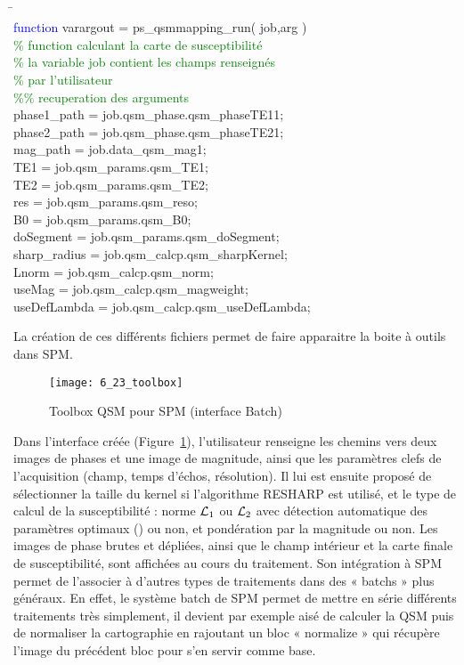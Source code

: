 {{\tt
\begin{tabbing}
\hspace{1cm}\=\hspace{1cm}\\
\> \textcolor{blue}{function} varargout = ps\_qsmmapping\_run( job,arg )\\
\> \textcolor{green}{\% function calculant la carte de susceptibilité}\\
\> \textcolor{green}{\% la variable job contient les champs renseignés}\\
\> \textcolor{green}{\% par l’utilisateur}\\
\> \textcolor{green}{\%\% recuperation des arguments}\\
\> phase1\_path = job.qsm\_phase.qsm\_phaseTE1{1};\\
\> phase2\_path = job.qsm\_phase.qsm\_phaseTE2{1};\\
\> mag\_path = job.data\_qsm\_mag{1};\\
\> TE1 = job.qsm\_params.qsm\_TE1;\\
\> TE2 = job.qsm\_params.qsm\_TE2;\\
\> res = job.qsm\_params.qsm\_reso;\\
\> B0 = job.qsm\_params.qsm\_B0;\\
\> doSegment = job.qsm\_params.qsm\_doSegment;\\
\> sharp\_radius = job.qsm\_calcp.qsm\_sharpKernel;\\
\> Lnorm = job.qsm\_calcp.qsm\_norm;\\
\> useMag = job.qsm\_calcp.qsm\_magweight;\\
\> useDefLambda = job.qsm\_calcp.qsm\_useDefLambda;\\
\end{tabbing}
}
La création de ces différents fichiers permet de faire apparaitre la boite à outils dans SPM.
\begin{figure}[!t]
\centering
\texttt{[image: 6\_23\_toolbox]}
\caption{Toolbox QSM pour SPM (interface Batch)}
\label{fig:6_23_toolbox}	
\end{figure}
Dans l’interface créée (Figure~\ref{fig:6_23_toolbox}), l’utilisateur renseigne les chemins vers deux images de phases et
une image de magnitude, ainsi que les paramètres clefs de l’acquisition (champ, temps d’échos,
résolution). Il lui est ensuite proposé de sélectionner la taille du kernel si l’algorithme RESHARP est
utilisé, et le type de calcul de la susceptibilité : norme ${\cal L}_1$ ou ${\cal L}_2$ avec détection automatique des
paramètres optimaux (\cite{Bilgic2014}) ou non, et pondération par la magnitude ou non. Les images de phase brutes
et dépliées, ainsi que le champ intérieur et la carte finale de susceptibilité, sont affichées au cours du
traitement. Son intégration à SPM permet de l’associer à d’autres types de traitements dans des
« batchs » plus généraux. En effet, le système batch de SPM permet de mettre en série différents
traitements très simplement, il devient par exemple aisé de calculer la QSM puis de normaliser la
cartographie en rajoutant un bloc « normalize » qui récupère l’image du précédent bloc pour s’en
servir comme base.

}
